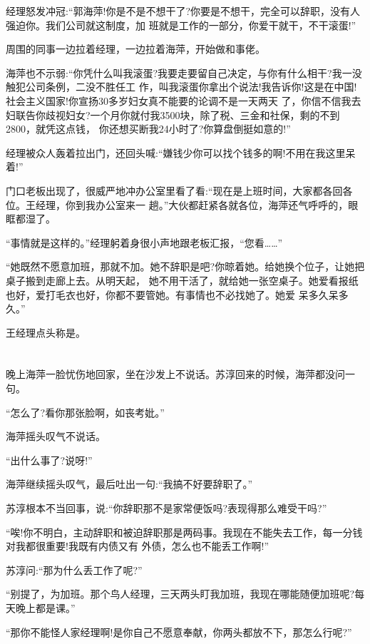 \documentclass[11pt,a4paper,onecolumn]{article}
\begin{document}
经理怒发冲冠:``郭海萍!你是不是不想干了?你要是不想干，完全可以辞职，没有人强迫你。我们公司就这制度，加
班就是工作的一部分，你爱干就干，不干滚蛋!''

周围的同事一边拉着经理，一边拉着海萍，开始做和事佬。

海萍也不示弱:``你凭什么叫我滚蛋?我要走要留自己决定，与你有什么相干?我一没触犯公司条例，二没不胜任工
作，叫我滚蛋你拿出个说法!我告诉你!这是在中国!社会主义国家!你宣扬30多岁妇女真不能要的论调不是一天两天
了，你信不信我去妇联告你歧视妇女?一个月你就付我3500块，除了税、三金和社保，剩的不到2800，就凭这点钱，
你还想买断我24小时了?你算盘倒挺如意的!''

经理被众人轰着拉出门，还回头喊:``嫌钱少你可以找个钱多的啊!不用在我这里呆着!''

门口老板出现了，很威严地冲办公室里看了看:``现在是上班时间，大家都各回各位。王经理，你到我办公室来一
趟。''大伙都赶紧各就各位，海萍还气呼呼的，眼眶都湿了。

``事情就是这样的。''经理躬着身很小声地跟老板汇报，``您看……''

``她既然不愿意加班，那就不加。她不辞职是吧?你晾着她。给她换个位子，让她把桌子搬到走廊上去。从明天起，
她不用干活了，就给她一张空桌子。她爱看报纸也好，爱打毛衣也好，你都不要管她。有事情也不必找她了。她爱
呆多久呆多久。''

王经理点头称是。

\section[\thesection]{}

晚上海萍一脸忧伤地回家，坐在沙发上不说话。苏淳回来的时候，海萍都没问一句。

``怎么了?看你那张脸啊，如丧考妣。''

海萍摇头叹气不说话。

``出什么事了?说呀!''

海萍继续摇头叹气，最后吐出一句:``我搞不好要辞职了。''

苏淳根本不当回事，说:``你辞职那不是家常便饭吗?表现得那么难受干吗?''

``唉!你不明白，主动辞职和被迫辞职那是两码事。我现在不能失去工作，每一分钱对我都很重要!我既有内债又有
外债，怎么也不能丢工作啊!''

苏淳问:``那为什么丢工作了呢?''

``别提了，为加班。那个鸟人经理，三天两头盯我加班，我现在哪能随便加班呢?每天晚上都是课。''

``那你不能怪人家经理啊!是你自己不愿意奉献，你两头都放不下，那怎么行呢?''
\end{document}
